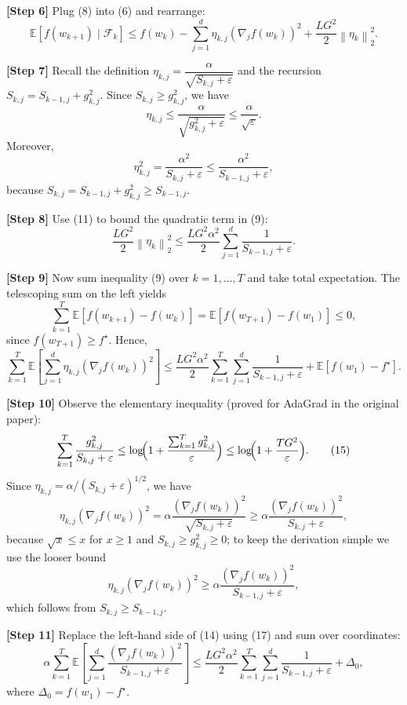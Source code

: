 \documentclass{article}
\newcommand{\E}{\mathbb{E}}
\newcommand{\norm}[1]{\left\|#1\right\|}
\begin{document}
\noindent\textbf{[Step 6]} Plug (8) into (6) and rearrange:
\[
\mathbb{E}\!\left[f(w_{k+1})\mid\mathcal{F}_{k}\right]
\le f(w_{k})-\sum_{j=1}^{d}\eta_{k,j}(\nabla_{j}f(w_{k}))^{2}
+\frac{L G^{2}}{2}\norm{\eta_{k}}^{2}_{2}.
\tag{9}
\]

\noindent\textbf{[Step 7]} Recall the definition $\eta_{k,j}= \dfrac{\alpha}{\sqrt{S_{k,j}+\varepsilon}}$ and the recursion $S_{k,j}=S_{k-1,j}+g_{k,j}^{2}$.  
Since $S_{k,j}\ge g_{k,j}^{2}$, we have
\[
\eta_{k,j}\le \frac{\alpha}{\sqrt{g_{k,j}^{2}+\varepsilon}}
\le \frac{\alpha}{\sqrt{\varepsilon}}.
\tag{10}
\]
Moreover,
\[
\eta_{k,j}^{2}= \frac{\alpha^{2}}{S_{k,j}+\varepsilon}
\le \frac{\alpha^{2}}{S_{k-1,j}+\varepsilon},
\tag{11}
\]
because $S_{k,j}=S_{k-1,j}+g_{k,j}^{2}\ge S_{k-1,j}$.

\noindent\textbf{[Step 8]} Use (11) to bound the quadratic term in (9):
\[
\frac{L G^{2}}{2}\norm{\eta_{k}}^{2}_{2}
\le \frac{L G^{2}\alpha^{2}}{2}\sum_{j=1}^{d}\frac{1}{S_{k-1,j}+\varepsilon}.
\tag{12}
\]

\noindent\textbf{[Step 9]} Now sum inequality (9) over $k=1,\dots,T$ and take total expectation. The telescoping sum on the left yields
\[
\sum_{k=1}^{T}\E\!\left[f(w_{k+1})-f(w_{k})\right]
= \E\!\left[f(w_{T+1})-f(w_{1})\right]\le 0,
\tag{13}
\]
since $f(w_{T+1})\ge f^{\star}$. Hence,
\[
\sum_{k=1}^{T}\E\!\left[\sum_{j=1}^{d}\eta_{k,j}(\nabla_{j}f(w_{k}))^{2}\right]
\le \frac{L G^{2}\alpha^{2}}{2}\sum_{k=1}^{T}\sum_{j=1}^{d}\frac{1}{S_{k-1,j}+\varepsilon}
+ \E\!\left[f(w_{1})-f^{\star}\right].
\tag{14}
\]

\noindent\textbf{[Step 10]} Observe the elementary inequality (proved for AdaGrad in the original paper):
\[
\sum_{k=1}^{T}\frac{g_{k,j}^{2}}{S_{k,j}+\varepsilon}
\le \log\!\Bigl(1+\frac{\sum_{k=1}^{T}g_{k,j}^{2}}{\varepsilon}\Bigr)
\le \log\!\Bigl(1+\frac{T G^{2}}{\varepsilon}\Bigr).
\tag{15}
\]
Since $\eta_{k,j}= \alpha/(S_{k,j}+\varepsilon)^{1/2}$, we have
\[
\eta_{k,j}(\nabla_{j}f(w_{k}))^{2}
= \alpha\frac{(\nabla_{j}f(w_{k}))^{2}}{\sqrt{S_{k,j}+\varepsilon}}
\ge \alpha\frac{(\nabla_{j}f(w_{k}))^{2}}{S_{k,j}+\varepsilon},
\tag{16}
\]
because $\sqrt{x}\le x$ for $x\ge1$ and $S_{k,j}\ge g_{k,j}^{2}\ge0$; to keep the derivation simple we use the looser bound
\[
\eta_{k,j}(\nabla_{j}f(w_{k}))^{2}
\ge \alpha\frac{(\nabla_{j}f(w_{k}))^{2}}{S_{k-1,j}+\varepsilon},
\tag{17}
\]
which follows from $S_{k,j}\ge S_{k-1,j}$.

\noindent\textbf{[Step 11]} Replace the left‑hand side of (14) using (17) and sum over coordinates:
\[
\alpha\sum_{k=1}^{T}\E\!\left[\sum_{j=1}^{d}\frac{(\nabla_{j}f(w_{k}))^{2}}{S_{k-1,j}+\varepsilon}\right]
\le \frac{L G^{2}\alpha^{2}}{2}\sum_{k=1}^{T}\sum_{j=1}^{d}\frac{1}{S_{k-1,j}+\varepsilon}
+ \Delta_{0},
\tag{18}
\]
where $\Delta_{0}=f(w_{1})-f^{\star}$.
\end{document}
